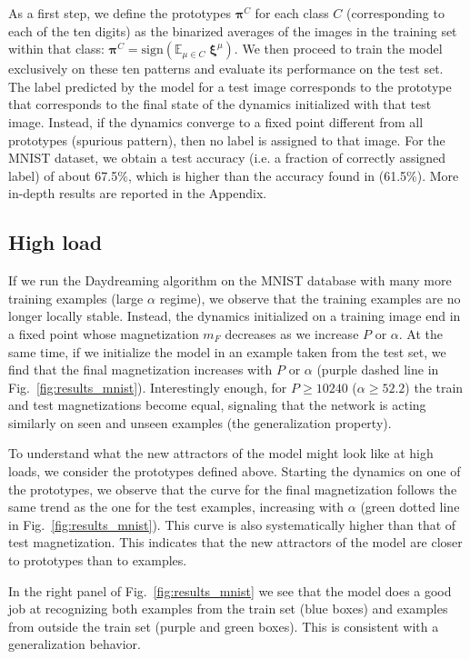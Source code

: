 \documentclass[a4paper]{cas-sc}
\begin{document}
As a first step, we define the prototypes $\pmb{\pi}^C$ for each class $C$ (corresponding to each of the ten digits) as the binarized averages of the images in the training set within that class:
$
    \pmb{\pi}^C = \mathrm{sign} \left( \mathbb{E}_{\mu \in C} \; \pmb{\xi}^\mu \right).
$
We then proceed to train the model exclusively on these ten patterns and evaluate its performance on the test set. The label predicted by the model for a test image corresponds to the prototype that corresponds to the final state of the dynamics initialized with that test image. Instead, if the dynamics converge to a fixed point different from all prototypes (spurious pattern), then no label is assigned to that image. For the MNIST dataset, we obtain a test accuracy (i.e. a fraction of correctly assigned label) of about 67.5$\%$, which is higher than the accuracy found in \cite{belyaev2020classification} (61.5\%). More in-depth results are reported in the Appendix.
 
\subsection{High load}
If we run the Daydreaming algorithm on the MNIST database with many more training examples (large $\alpha$ regime), we observe that the training examples are no longer locally stable. Instead, the dynamics initialized on a training image end in a fixed point whose magnetization $m_F$ decreases as we increase $P$ or $\alpha$. At the same time, if we initialize the model in an example taken from the test set, we find that the final magnetization increases with $P$ or $\alpha$ (purple dashed line in Fig.~\ref{fig:results_mnist}). Interestingly enough, for $P\geq10240$ ($\alpha\geq 52.2$) the train and test magnetizations become equal, signaling that the network is acting similarly on seen and unseen examples (the generalization property).

To understand what the new attractors of the model might look like at high loads, we consider the prototypes defined above. Starting the dynamics on one of the prototypes, we observe that the curve for the final magnetization follows the same trend as the one for the test examples, increasing with $\alpha$ (green dotted line in Fig.~\ref{fig:results_mnist}). This curve is also systematically higher than that of test magnetization. This indicates that the new attractors of the model are closer to prototypes than to examples.

In the right panel of Fig.~\ref{fig:results_mnist} we see that the model does a good job at recognizing both examples from the train set (blue boxes) and examples from outside the train set (purple and green boxes). This is consistent with a generalization behavior.
\end{document}
